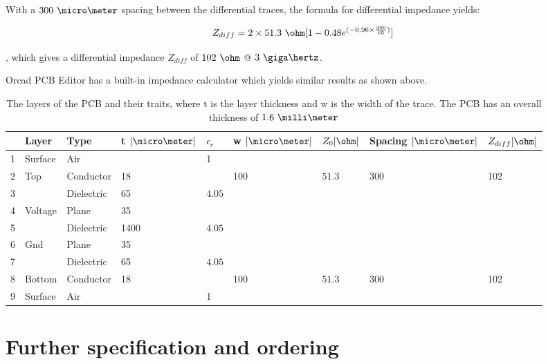 \documentclass[main.tex]{subfiles}
\begin{document}
With a $300\ \micro\meter$ spacing between the differential traces, the formula for differential impedance yields:

\begin{equation}
    Z_{diff} = 2 \times 51.3\ \ohm [1 - 0.48 e^{(-0.96 \times \frac{300}{65})}]
  \label{eq:zdiff}
\end{equation}

, which gives a differential impedance $Z_{diff}$ of $102\ \ohm$ @ $3\ \giga\hertz$.


Orcad PCB Editor has a built-in impedance calculator which yields similar results as shown above.

\begin{table} [ht]
\begin{center}
    \begin{tabular}{| l | l | l | l | l | l | l | l | l |}
    \hline
     & Layer & Type & t $[\micro\meter]$ & $\epsilon_r$ & w $[\micro\meter]$  & $Z_0 [\ohm]$ & Spacing $[\micro\meter]$  & $Z_{diff} [\ohm]$ \\ 
     \hline
    1 	  & Surface & Air 		 & 		& 1 	 & 	   & 					& 	  & \\ \hline
    2 	  & Top 	& Conductor  & 18 	&        & 100 & $51.3$             & 300 & 102\\ \hline
    3 	  &  		& Dielectric & 65 	& $4.05$ & 	   & 					& 	  & \\ \hline
    4 	  & Voltage & Plane 	 & 35 	&        & 	   & 					& 	  & \\ \hline
    5 	  &  		& Dielectric & 1400 & $4.05$ & 	   &					&	  & \\ \hline
    6 	  & Gnd 	& Plane 	 & 35 	&        & 	   & 					& 	  & \\ \hline
    7 	  &  		& Dielectric & 65 	& $4.05$ &     & 					& 	  & \\ \hline
    8 	  & Bottom 	& Conductor  & 18 	&        & 100 & $51.3$             & 300 & 102\\ \hline
    9 	  & Surface & Air 		 & 	  	& 1 	 & 	   & 					& 	  & \\ \hline
    \end{tabular}
     \caption{The layers of the PCB and their traits, where t is the layer thickness and w is the width of the trace. The PCB has an overall thickness of $1.6\ \milli\meter$}
	\label{tab:Xsect1}
\end{center}
\end{table}

\section{Further specification and ordering}
\end{document}
